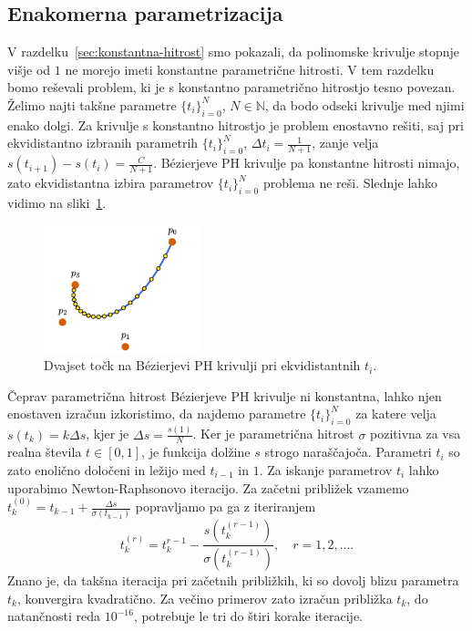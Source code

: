 \documentclass[isrm2, tisk]{fmfdelo}
\newcommand{\N}{\mathbb N}
\begin{document}
    \subsection{Enakomerna parametrizacija}
    V razdelku~\ref{sec:konstantna-hitrost} smo pokazali, da polinomske krivulje stopnje višje od $1$ ne morejo imeti konstantne parametrične hitrosti.
    V tem razdelku bomo reševali problem, ki je s konstantno parametrično hitrostjo tesno povezan.
    Želimo najti takšne parametre $\{t_i\}_{i=0}^{N}$, $N\in \N$, da bodo odseki krivulje med njimi enako dolgi.
    Za krivulje s konstantno hitrostjo je problem enostavno rešiti, saj pri ekvidistantno izbranih parametrih $\{t_i\}_{i=0}^{N}$, $\Delta t_i = \frac{1}{N+1}$, zanje velja $s(t_{i+1})-s(t_i) =\frac{C}{N+1}$.
    Bézierjeve PH krivulje pa konstantne hitrosti nimajo, zato ekvidistantna izbira parametrov $\{t_i\}_{i=0}^{N}$  problema ne reši.
    Slednje lahko vidimo na sliki~\ref{fig:enakomerni-t}.
    \begin{figure}[h]
        \centering
        \includegraphics[width = 0.40\textwidth]{images/enakomerni-t}
        \caption{Dvajset točk na Bézierjevi PH krivulji pri ekvidistantnih $t_i$.}
        \label{fig:enakomerni-t}
    \end{figure}
    Čeprav parametrična hitrost Bézierjeve PH krivulje ni konstantna, lahko njen enostaven izračun izkoristimo, da najdemo parametre $\{t_i\}^{N}_{i=0}$ za katere velja $s(t_k)=k\Delta s$, kjer je $\Delta s = \frac{s(1)}{N}$.
    Ker je parametrična hitrost $\sigma$ pozitivna za vsa realna števila $t\in[0,1]$, je funkcija dolžine $s$ strogo naraščajoča.
    Parametri $t_i$ so zato enolično določeni in ležijo med $t_{i-1}$ in $1$.
    Za iskanje parametrov $t_i$ lahko uporabimo Newton-Raphsonovo iteracijo.
    Za začetni približek vzamemo $t_k^{(0)} = t_{k-1} + \frac{\Delta s}{\sigma(t_{k-1})}$ popravljamo pa ga z iteriranjem
    \[ t_k^{(r)} = t_k^{r-1} - \frac{s(t_k^{(r-1)})}{\sigma(t_k^{(r-1)})}, \quad r=1,2,\ldots .\]
    Znano je, da takšna iteracija pri začetnih približkih, ki so dovolj blizu parametra $t_k$, konvergira kvadratično.
    Za večino primerov zato izračun približka $t_k$, do natančnosti reda $10^{-16}$, potrebuje le tri do štiri korake iteracije.
\end{document}
